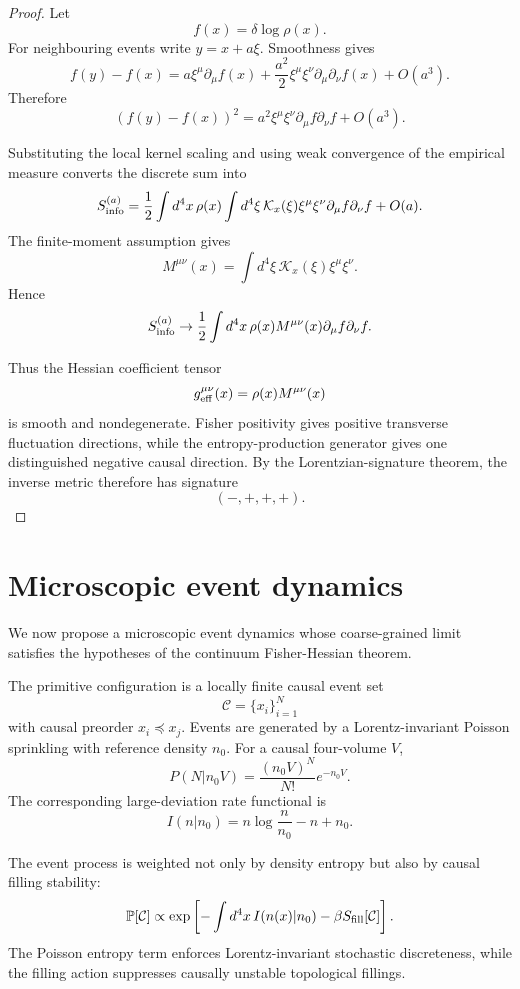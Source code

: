 \documentclass[11pt]{article}
\begin{document}
\begin{proof}
Let
\[
f(x)=\delta\log\rho(x).
\]
For neighbouring events write $y=x+a\xi$. Smoothness gives
\[
f(y)-f(x)
=
a\xi^\mu\partial_\mu f(x)
+
\frac{a^2}{2}\xi^\mu\xi^\nu\partial_\mu\partial_\nu f(x)
+
O(a^3).
\]
Therefore
\[
(f(y)-f(x))^2
=
a^2\xi^\mu\xi^\nu
\partial_\mu f\partial_\nu f
+
O(a^3).
\]

Substituting the local kernel scaling and using weak convergence of the empirical measure converts the discrete sum into
\[
S_{\rm info}^{(a)}
=
\frac12
\int d^4x\,\rho(x)
\int d^4\xi\,\mathcal K_x(\xi)
\xi^\mu\xi^\nu
\partial_\mu f\partial_\nu f
+
O(a).
\]
The finite-moment assumption gives
\[
M^{\mu\nu}(x)
=
\int d^4\xi\,\mathcal K_x(\xi)\xi^\mu\xi^\nu.
\]
Hence
\[
S_{\rm info}^{(a)}
\to
\frac12
\int d^4x\,\rho(x)M^{\mu\nu}(x)
\partial_\mu f\partial_\nu f.
\]

Thus the Hessian coefficient tensor
\[
g_{\rm eff}^{\mu\nu}(x)=\rho(x)M^{\mu\nu}(x)
\]
is smooth and nondegenerate. Fisher positivity gives positive transverse fluctuation directions, while the entropy-production generator gives one distinguished negative causal direction. By the Lorentzian-signature theorem, the inverse metric therefore has signature
\[
(-,+,+,+).
\]
\end{proof}

\section{Microscopic event dynamics}

We now propose a microscopic event dynamics whose coarse-grained limit satisfies the hypotheses of the continuum Fisher-Hessian theorem.

The primitive configuration is a locally finite causal event set
\[
\mathcal C=\{x_i\}_{i=1}^N
\]
with causal preorder $x_i\preceq x_j$. Events are generated by a Lorentz-invariant Poisson sprinkling with reference density $n_0$. For a causal four-volume $V$,
\[
P(N|n_0V)=\frac{(n_0V)^N}{N!}e^{-n_0V}.
\]
The corresponding large-deviation rate functional is
\[
I(n|n_0)=n\log\frac{n}{n_0}-n+n_0.
\]

The event process is weighted not only by density entropy but also by causal filling stability:
\[
\mathbb P[\mathcal C]
\propto
\exp\left[
-\int d^4x\,I(n(x)|n_0)
-\beta S_{\rm fill}[\mathcal C]
\right].
\]
The Poisson entropy term enforces Lorentz-invariant stochastic discreteness, while the filling action suppresses causally unstable topological fillings.
\end{document}
